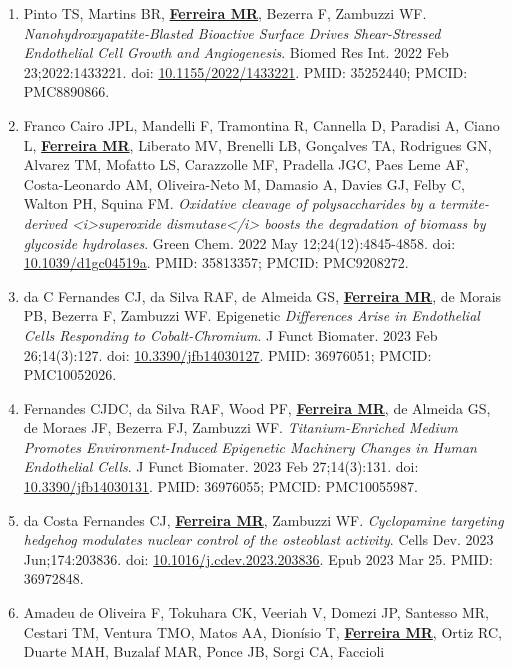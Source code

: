 \documentclass[
  letterpaper,
  DIV=11,
  numbers=noendperiod]{scrartcl}
\begin{document}
\begin{enumerate}
  Epub 2020 Dec 10. PMID: 33258548.
\item
  Pinto TS, Martins BR, \ul{\textbf{Ferreira MR}}, Bezerra F, Zambuzzi
  WF. \emph{Nanohydroxyapatite-Blasted Bioactive Surface Drives
  Shear-Stressed Endothelial Cell Growth and Angiogenesis}. Biomed Res
  Int. 2022 Feb 23;2022:1433221. doi:
  \href{https://www.doi.org/10.1155/2022/1433221}{10.1155/2022/1433221}.
  PMID: 35252440; PMCID: PMC8890866.
\item
  Franco Cairo JPL, Mandelli F, Tramontina R, Cannella D, Paradisi A,
  Ciano L, \ul{\textbf{Ferreira MR}}, Liberato MV, Brenelli LB,
  Gonçalves TA, Rodrigues GN, Alvarez TM, Mofatto LS, Carazzolle MF,
  Pradella JGC, Paes Leme AF, Costa-Leonardo AM, Oliveira-Neto M,
  Damasio A, Davies GJ, Felby C, Walton PH, Squina FM. \emph{Oxidative
  cleavage of polysaccharides by a termite-derived
  \textless i\textgreater superoxide dismutase\textless/i\textgreater{}
  boosts the degradation of biomass by glycoside hydrolases}. Green
  Chem. 2022 May 12;24(12):4845-4858. doi:
  \href{https://www.doi.org/10.1039/d1gc04519a}{10.1039/d1gc04519a}.
  PMID: 35813357; PMCID: PMC9208272.
\item
  da C Fernandes CJ, da Silva RAF, de Almeida GS, \ul{\textbf{Ferreira
  MR}}, de Morais PB, Bezerra F, Zambuzzi WF. Epigenetic
  \emph{Differences Arise in Endothelial Cells Responding to
  Cobalt-Chromium}. J Funct Biomater. 2023 Feb 26;14(3):127. doi:
  \href{https://www.doi.org/10.3390/jfb14030127}{10.3390/jfb14030127}.
  PMID: 36976051; PMCID: PMC10052026.
\item
  Fernandes CJDC, da Silva RAF, Wood PF, \ul{\textbf{Ferreira MR}}, de
  Almeida GS, de Moraes JF, Bezerra FJ, Zambuzzi WF.
  \emph{Titanium-Enriched Medium Promotes Environment-Induced Epigenetic
  Machinery Changes in Human Endothelial Cells}. J Funct Biomater. 2023
  Feb 27;14(3):131. doi:
  \href{https://www.doi.org/10.3390/jfb14030131}{10.3390/jfb14030131}.
  PMID: 36976055; PMCID: PMC10055987.
\item
  da Costa Fernandes CJ, \ul{\textbf{Ferreira MR}}, Zambuzzi WF.
  \emph{Cyclopamine targeting hedgehog modulates nuclear control of the
  osteoblast activity}. Cells Dev. 2023 Jun;174:203836. doi:
  \href{https://www.doi.org/10.1016/j.cdev.2023.203836}{10.1016/j.cdev.2023.203836}.
  Epub 2023 Mar 25. PMID: 36972848.
\item
  Amadeu de Oliveira F, Tokuhara CK, Veeriah V, Domezi JP, Santesso MR,
  Cestari TM, Ventura TMO, Matos AA, Dionísio T, \ul{\textbf{Ferreira
  MR}}, Ortiz RC, Duarte MAH, Buzalaf MAR, Ponce JB, Sorgi CA, Faccioli

\end{enumerate}
\end{document}
